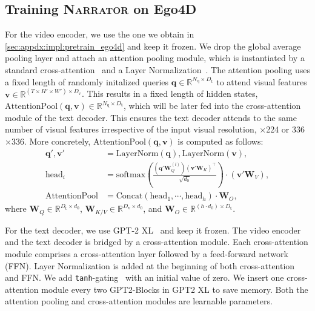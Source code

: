 \documentclass[10pt,twocolumn,letterpaper]{article}
\newcommand{\myparagraph}[1]{\vspace{0pt}\noindent{\bf #1}}
\newcommand{\narrator}{\textsc{Narrator}\xspace}
\begin{document}
\subsection{Training \narrator on Ego4D}
\myparagraph{Architecture.}
For the video encoder, we use the one we obtain in \cref{sec:appdx:impl:pretrain_ego4d} and keep it frozen.
We drop the global average pooling layer and attach an attention pooling module, which is instantiated by a standard cross-attention~\cite{vaswani2017attention} and a Layer Normalization~\cite{ba2016layernorm}.
The attention pooling uses a fixed length of randomly initalized queries $\mathbf{q}\in\mathbb{R}^{N_\mathrm{q}\times D_\mathrm{t}}$ to attend visual features $\mathbf{v}\in\mathbb{R}^{(T\times H' \times W')\times D_\mathrm{v}}$.
This results in a fixed length of hidden states, $\mathrm{AttentionPool}(\mathbf{q}, \mathbf{v})\in\mathbb{R}^{N_\mathrm{q}\times D_\mathrm{t}}$, which will be later fed into the cross-attention module of the text decoder. 
This ensures the text decoder attends to the same number of visual features irrespective of the input visual resolution, $\times$224 or 336$\times$336.
More concretely, $ \mathrm{AttentionPool}(\mathbf{q}, \mathbf{v}) $ is computed as follows:
{\small
\begin{align*}
\mathbf{q}', \mathbf{v}' &= \mathrm{LayerNorm}(\mathbf{q}), \mathrm{LayerNorm}(\mathbf{v}), \\
\mathrm{head}_i &= \mathrm{softmax}\left(\frac{(\mathbf{q}'\mathbf{W}_Q^{(i)}) (\mathbf{v}'\mathbf{W}_K)^\top}{\sqrt{d_0}}\right)\cdot(\mathbf{v}'\mathbf{W}_V), \\
\mathrm{AttentionPool} &= \mathrm{Concat}(\mathrm{head}_1, \cdots, \mathrm{head}_h)\cdot\mathbf{W}_O,
\end{align*}
}
where $\mathbf{W}_Q\in\mathbb{R}^{D_\mathrm{t} \times d_0}$, $\mathbf{W}_{K/V}\in\mathbb{R}^{D_\mathrm{v} \times d_0}$, and $\mathbf{W}_O\in\mathbb{R}^{(h\cdot d_0) \times D_\mathrm{t}}$.

For the text decoder, we use GPT-2 XL~\cite{radford2019gpt2} and keep it frozen.
The video encoder and the text decoder is bridged by a cross-attention module.
Each cross-attention module comprises a cross-attention layer followed by a feed-forward network (FFN).
Layer Normalization is added at the beginning of both cross-attention and FFN.
We add \texttt{tanh}-gating~\cite{hochreiter1997lstm} with an initial value of zero.
We insert one cross-attention module every two GPT2-Blocks in GPT2 XL to save memory.
Both the attention pooling and cross-attention modules are learnable parameters.
\end{document}
